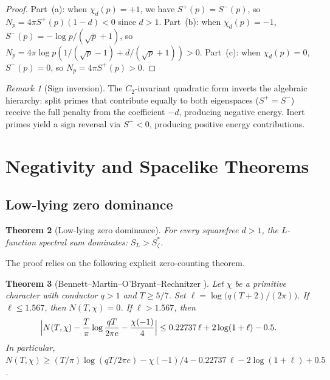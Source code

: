 \documentclass[12pt,reqno]{amsart}
\theoremstyle{plain}
\newtheorem{theorem}{Theorem}[section]
\theoremstyle{definition}
\theoremstyle{remark}
\newtheorem{remark}[theorem]{Remark}
\begin{document}
\begin{proof}
Part~(a): when $\chi_d(p) = +1$, we have $S^+(p) = S^-(p)$, so $N_p = 4\pi S^+(p)(1-d) < 0$ since $d > 1$. Part~(b): when $\chi_d(p) = -1$, $S^-(p) = -\log p/(\sqrt{p}+1)$, so $N_p = 4\pi\log p(1/(\sqrt{p}-1) + d/(\sqrt{p}+1)) > 0$. Part~(c): when $\chi_d(p) = 0$, $S^-(p) = 0$, so $N_p = 4\pi S^+(p) > 0$.
\end{proof}

\begin{remark}[Sign inversion]
The $C_2$-invariant quadratic form inverts the algebraic hierarchy: split primes that contribute equally to both eigenspaces ($S^+ = S^-$) receive the full penalty from the coefficient $-d$, producing negative energy. Inert primes yield a sign reversal via $S^- < 0$, producing positive energy contributions.
\end{remark}

\section{Negativity and Spacelike Theorems}\label{sec:negativity}

\subsection{Low-lying zero dominance}

\begin{theorem}[Low-lying zero dominance]\label{thm:low-lying}
For every squarefree $d > 1$, the $L$-function spectral sum dominates: $S_L > S_\zeta^*$.
\end{theorem}

The proof relies on the following explicit zero-counting theorem.

\begin{theorem}[Bennett--Martin--O'Bryant--Rechnitzer {\cite[Theorem~1.1]{BMOR2021}}]\label{thm:BMOR}
Let $\chi$ be a primitive character with conductor $q > 1$ and $T \geq 5/7$.
Set $\ell = \log\bigl(q(T+2)/(2\pi)\bigr)$.
If $\ell \leq 1.567$, then $N(T,\chi) = 0$.
If $\ell > 1.567$, then
\[
\Bigl|N(T,\chi) - \frac{T}{\pi}\log\frac{qT}{2\pi e}
- \frac{\chi(-1)}{4}\Bigr|
\leq 0.22737\,\ell + 2\log(1 + \ell) - 0.5.
\]
In particular, $N(T,\chi) \geq (T/\pi)\log(qT/2\pi e)
- \chi(-1)/4 - 0.22737\,\ell - 2\log(1+\ell) + 0.5$.
\end{theorem}
\end{document}

